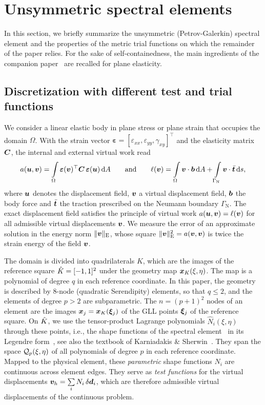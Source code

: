 \section{Unsymmetric spectral elements}
\label{sec:formulation}
%
In this section, we briefly summarize the unsymmetric (Petrov-Galerkin) spectral element and the properties of the metric trial functions on which the remainder of the paper relies. For the sake of self-containedness, the main ingredients of the companion paper~\cite{Eisentraeger2026axisymmetric} are recalled for plane elasticity.
%
\subsection{Discretization with different test and trial functions}
\label{sec:pg}
%
We consider a linear elastic body in plane stress or plane strain that occupies the domain $\Omega$. With the strain vector $\bm\varepsilon=[\varepsilon_{xx},\varepsilon_{yy},\gamma_{xy}]^\top$ and the elasticity matrix $\bm{C}$, the internal and external virtual work read
%
\begin{equation}
  a(\bm{u},\bm{v})=\int\limits_{\Omega}\bm\varepsilon(\bm{v})^\top\bm{C}\,\bm\varepsilon(\bm{u})\mathop{}\!\mathrm{d} A\qquad\text{and}\qquad
  \ell(\bm{v})=\int\limits_{\Omega}\bm{v}\cdot\bm{b}\mathop{}\!\mathrm{d} A+\int\limits_{\Gamma_{\mathrm N}}\bm{v}\cdot\bar{\bm{t}}\mathop{}\!\mathrm{d} s ,
  \label{eq:forms}
\end{equation}
%
where $\bm{u}$ denotes the displacement field, $\bm{v}$ a virtual displacement field, $\bm{b}$ the body force and $\bar{\bm{t}}$ the traction prescribed on the Neumann boundary $\Gamma_{\mathrm N}$. The exact displacement field satisfies the principle of virtual work $a(\bm{u},\bm{v})=\ell(\bm{v})$ for all admissible virtual displacements $\bm{v}$. We measure the error of an approximate solution in the energy norm $\lVert \bm{v}\rVert_{\mathrm{E}}$, whose square $\lVert \bm{v}\rVert_{\mathrm{E}}^2=a(\bm{v},\bm{v})$ is twice the strain energy of the field $\bm{v}$.

The domain is divided into quadrilaterals $K$, which are the images of the reference square $\hat K=[-1,1]^2$ under the geometry map $\bm{x}_K(\xi,\eta)$. The map is a polynomial of degree $q$ in each reference coordinate. In this paper, the geometry is described by 8-node (quadratic Serendipity) elements, so that $q\le2$, and the elements of degree $p>2$ are subparametric. The $n=(p+1)^2$ nodes of an element are the images $\bm{x}_j=\bm{x}_K(\bm\xi_j)$ of the GLL points $\bm\xi_j$ of the reference square. On $\hat K$, we use the tensor-product Lagrange polynomials $\hat N_i(\xi,\eta)$ through these points, i.e., the shape functions of the spectral element~\cite{Patera1984spectral} in its Legendre form~\cite{Ronquist1987legendre}, see also the textbook of Karniadakis \& Sherwin~\cite{Karniadakis2005spectral}. They span the space $\mathcal Q_p(\xi,\eta)$ of all polynomials of degree $p$ in each reference coordinate. Mapped to the physical element, these \emph{parametric} shape functions $N_i$ are continuous across element edges. They serve as \emph{test functions} for the virtual displacements $\bm{v}_h=\sum\limits_{i}N_i\,\delta\bm{d}_i$, which are therefore admissible virtual displacements of the continuous problem.

